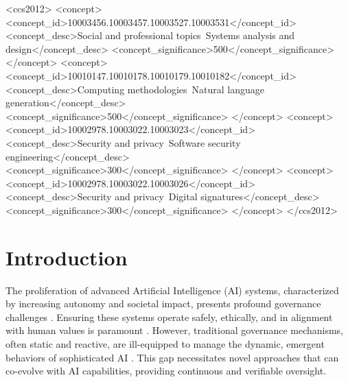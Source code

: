 \documentclass[sigconf,review,screen]{acmart}
\begin{document}
\begin{CCSXML}
<ccs2012>
   <concept>
       <concept_id>10003456.10003457.10003527.10003531</concept_id>
       <concept_desc>Social and professional topics~Systems analysis and design</concept_desc>
       <concept_significance>500</concept_significance>
       </concept>
   <concept>
       <concept_id>10010147.10010178.10010179.10010182</concept_id>
       <concept_desc>Computing methodologies~Natural language generation</concept_desc>
       <concept_significance>500</concept_significance>
       </concept>
   <concept>
       <concept_id>10002978.10003022.10003023</concept_id>
       <concept_desc>Security and privacy~Software security engineering</concept_desc>
       <concept_significance>300</concept_significance>
       </concept>
    <concept>
        <concept_id>10002978.10003022.10003026</concept_id>
        <concept_desc>Security and privacy~Digital signatures</concept_desc>
        <concept_significance>300</concept_significance>
    </concept>
 </ccs2012>
\end{CCSXML}



\maketitle

\section{Introduction}
The proliferation of advanced Artificial Intelligence (AI) systems, characterized by increasing autonomy and societal impact, presents profound governance challenges \cite{floridi2018ai,bostrom2014superintelligence}. Ensuring these systems operate safely, ethically, and in alignment with human values is paramount \cite{russell2015human}. However, traditional governance mechanisms, often static and reactive, are ill-equipped to manage the dynamic, emergent behaviors of sophisticated AI \cite{mittelstadt2019principles}. This gap necessitates novel approaches that can co-evolve with AI capabilities, providing continuous and verifiable oversight.
\end{document}
